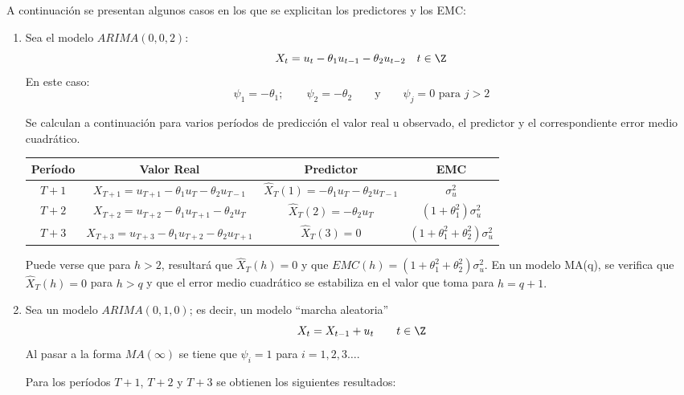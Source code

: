 \begin{ejemplo}
A continuaci\'{o}n se presentan algunos casos en los que se explicitan los predictores y los EMC:

\begin{enumerate}
\item Sea el modelo $ARIMA (0, 0, 2)$:
\[
X_{t} =u_{t} -\theta_{1} u_{t-1} -\theta_{2} u_{t-2} \quad t\in \Z
\]
En este caso:
\[
 \psi_{1} =-\theta_{1}; \qquad \psi_{2} =-\theta_{2}\qquad \text{y}\qquad \psi_{j} =0 \text{ para }j>2
\]

Se calculan a continuaci\'{o}n para varios per\'{i}odos de predicci\'{o}n el valor real u observado, el predictor y el correspondiente error medio cuadr\'{a}tico.

\begin{center}\small
\begin{tabular}{@{}cccc@{}}
\toprule
\textbf{Per\'{i}odo}& \textbf{Valor Real}& \textbf{Predictor}& \textbf{EMC} \\
\midrule
$T+1$& $X_{T+1} =u_{T+1} -\theta_{1} u_{T} -\theta_{2} u_{T-1} $& $\widehat{X}_{T} (1)=-\theta_{1} u_{T} -\theta_{2} u_{T-1} $& $\sigma_{u}^{2} $ \\[5pt]
$T+2$& $X_{T+2} =u_{T+2} -\theta_{1} u_{T+1} -\theta_{2} u_{T} $& $\widehat{X}_{T} (2)=-\theta_{2} u{ }_{T}$& $\left( {1+\theta_{1}^{2} } \right)\sigma_{u}^{2} $ \\[5pt]
$T+3$& $X_{T+3} =u_{T+3} -\theta_{1} u_{T+2} -\theta_{2} u_{T+1} $& $\widehat{X}_{T} (3)=0$& $\left( {1+\theta_{1}^{2} +\theta_{2}^{2} } \right)\sigma_{u}^{2} $ \\
\bottomrule
\end{tabular}
\end{center}

Puede verse que para $h>2$, resultar\'{a} que $\widehat{X}_{T} (h)=0$ y que $EMC(h)=\left( {1+\theta_{1}^{2} +\theta_{2}^{2} } \right)\sigma_{u}^{2} $. En un modelo MA(q), se verifica que $\widehat{X}_{T} (h)=0$ para $h > q$ y que el error medio cuadr\'{a}tico se estabiliza en el valor que toma para $h=q+1.$

\item Sea un modelo $ARIMA (0, 1, 0)$; es decir, un modelo ``marcha aleatoria''
\[
X_{t} =X_{t-1} +u_{t} \qquad t\in \Z
\]
Al pasar a la forma $MA( \infty )$ se tiene que $\psi_{i} =1$ para $i=1,2,3\ldots$.\newline

Para los per\'{i}odos $T+1$, $T+2$ y $T+3$ se obtienen los siguientes resultados: 


\end{enumerate}
\end{ejemplo}
